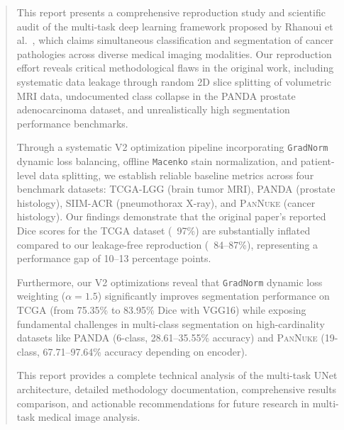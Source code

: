 \documentclass[11pt,a4paper,twoside]{report}
\newcommand{\dataset}[1]{\textsc{#1}}
\newcommand{\model}[1]{\texttt{#1}}
\begin{document}
\begin{abstract}
\noindent This report presents a comprehensive reproduction study and scientific audit of the multi-task deep learning framework proposed by Rhanoui et al.~\cite{ranoui2025multi}, which claims simultaneous classification and segmentation of cancer pathologies across diverse medical imaging modalities. Our reproduction effort reveals critical methodological flaws in the original work, including systematic data leakage through random 2D slice splitting of volumetric MRI data, undocumented class collapse in the \dataset{PANDA} prostate adenocarcinoma dataset, and unrealistically high segmentation performance benchmarks.

Through a systematic V2 optimization pipeline incorporating \model{GradNorm} dynamic loss balancing, offline \model{Macenko} stain normalization, and patient-level data splitting, we establish reliable baseline metrics across four benchmark datasets: \dataset{TCGA}-LGG (brain tumor MRI), \dataset{PANDA} (prostate histology), \dataset{SIIM}-ACR (pneumothorax X-ray), and \dataset{PanNuke} (cancer histology). Our findings demonstrate that the original paper's reported Dice scores for the \dataset{TCGA} dataset (~97\%) are substantially inflated compared to our leakage-free reproduction (~84--87\%), representing a performance gap of 10--13 percentage points.

Furthermore, our V2 optimizations reveal that \model{GradNorm} dynamic loss weighting ($\alpha=1.5$) significantly improves segmentation performance on \dataset{TCGA} (from 75.35\% to 83.95\% Dice with VGG16) while exposing fundamental challenges in multi-class segmentation on high-cardinality datasets like \dataset{PANDA} (6-class, 28.61--35.55\% accuracy) and \dataset{PanNuke} (19-class, 67.71--97.64\% accuracy depending on encoder).

This report provides a complete technical analysis of the multi-task UNet architecture, detailed methodology documentation, comprehensive results comparison, and actionable recommendations for future research in multi-task medical image analysis.
\end{abstract}

\tableofcontents
\listoffigures
\listoftables
\end{document}
